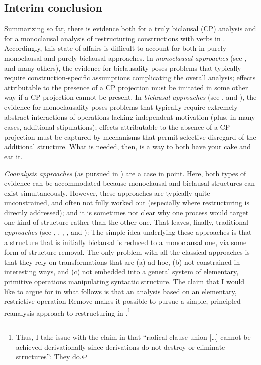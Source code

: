 \documentclass[output=paper]{langsci/langscibook}
\begin{document}
\subsection{Interim conclusion}

Summarizing so far, there is evidence both for a truly biclausal (CP) analysis
and for a monoclausal analysis of restructuring constructions with
 verbs in . Accordingly, this state of affairs is
difficult to account for both in purely monoclausal and purely biclausal
approaches. In {\it monoclausal approaches} (see
\citealt{Geilfuss:88,Haider:93,Haider:10,Kiss:95,Wurmbrand:01,Wurmbrand:07,Wurmbrand:15,Sternefeld:06},
and many others), the evidence for biclausality poses problems that typically
require construction-specific assumptions complicating the overall analysis;
effects attributable to the presence of a CP projection must be imitated in
some other way if a CP projection cannot be present. In {\it biclausal
approaches} (see
    \citealt{Baker1988,Sternefeld:90:pro,Mueller&Sternefeld:95,Sabel:96,Roberts:97:res,Hinterhoelzl:99},
    and \cite{Koopman&Szabolcsi:00}), the evidence for monoclausality poses
    problems that typically require extremely abstract interactions of
     operations lacking independent motivation (plus, in many
    cases, additional stipulations); effects attributable to the absence of a
    CP projection must be captured by mechanisms that permit selective
    disregard of the additional structure. What is needed, then, is a way to
    both have your cake and eat it.

{\it Coanalysis approaches} (as pursued in
\citealt{Huybregts:82,Bennis:83,Haegeman&Riemsdijk:86,DiSciullo&Williams:87,Sadock:91,Pesetsky:95})
are a case in point. Here, both types of evidence can be accommodated because
monoclausal and biclausal structures can exist simultaneously. However, these
approaches are typically quite unconstrained, and often not fully worked out
(especially where restructuring is directly addressed); and it is sometimes not
clear why one process would target one kind of structure rather than the other
one. That leaves, finally, traditional {\it {} approaches} (see
\citealt[Ch.~3]{Ross:67}, \citealt{Evers:75}, \citealt{Rizzi:82},
\citealt{Aissen&Perlmutter:83}, and \citealt{Stechow&Sternefeld:88}): The
simple idea underlying these approaches is that  a structure that is initially
biclausal is reduced to a monoclausal one, via some form of structure removal.
The only problem with all the classical  approaches is that they rely
on transformations that are (a) ad hoc, (b) not constrained in interesting
ways, and (c) not embedded into a general system of elementary, primitive
operations manipulating syntactic structure.  The claim that I would like to
argue for in what follows is that an analysis based on an elementary,
restrictive operation Remove makes it possible to pursue a simple, principled
reanalysis approach to restructuring in .\footnote{Thus, I take issue
    with the claim in \textcite[309]{Haider:10} that ``radical clause union
[\dots] cannot be achieved derivationally since derivations do not destroy or
eliminate structures'': They do.}
\end{document}
